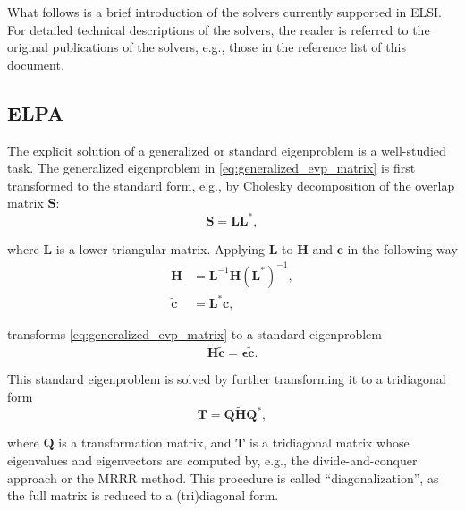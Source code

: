 \documentclass{report}
\begin{document}
\bigskip
What follows is a brief introduction of the solvers currently supported in ELSI.  For detailed technical descriptions of the solvers, the reader is referred to the original publications of the solvers, e.g., those in the reference list of this document.\\

\subsection{ELPA}
\label{subsec:solvers_elpa}
The explicit solution of a generalized or standard eigenproblem is a well-studied task.  The generalized eigenproblem in \ref{eq:generalized_evp_matrix} is first transformed to the standard form, e.g., by Cholesky decomposition of the overlap matrix $\boldsymbol{S}$:\\
\begin{equation}
\label{eq:cholesky}
\boldsymbol{S} = \boldsymbol{L} \boldsymbol{L}^* ,
\end{equation}

where $\boldsymbol{L}$ is a lower triangular matrix.  Applying $\boldsymbol{L}$ to $\boldsymbol{H}$ and $\boldsymbol{c}$ in the following way\\
\begin{equation}
\label{eq:to_standard}
\begin{split}
\boldsymbol{\tilde{H}} & = \boldsymbol{L}^{-1} \boldsymbol{H} (\boldsymbol{L}^*)^{-1} ,\\
\boldsymbol{\tilde{c}} & = \boldsymbol{L}^* \boldsymbol{c} ,
\end{split}
\end{equation}

transforms \ref{eq:generalized_evp_matrix} to a standard eigenproblem\\
\begin{equation}
\label{eq:standard_evp}
\boldsymbol{\tilde{H}} \boldsymbol{\tilde{c}} = \boldsymbol{\epsilon} \boldsymbol{\tilde{c}} .
\end{equation}

This standard eigenproblem is solved by further transforming it to a tridiagonal form\\
\begin{equation}
\label{eq:elpa1}
\boldsymbol{T} = \boldsymbol{Q} \boldsymbol{\tilde{H}} \boldsymbol{Q}^* ,
\end{equation}

where $\boldsymbol{Q}$ is a transformation matrix, and $\boldsymbol{T}$ is a tridiagonal matrix whose eigenvalues and eigenvectors are computed by, e.g., the divide-and-conquer approach or the MRRR method.  This procedure is called ``diagonalization'', as the full matrix is reduced to a (tri)diagonal form.\\
\end{document}
